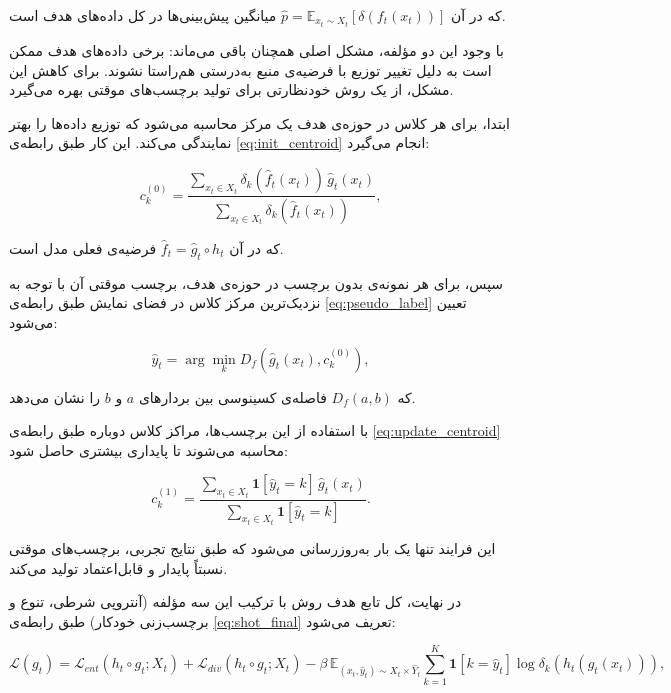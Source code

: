 که در آن $\hat{p} = \mathbb{E}_{x_t \sim X_t}[\delta(f_t(x_t))]$ میانگین پیش‌بینی‌ها در کل داده‌های هدف است.  

با وجود این دو مؤلفه، مشکل اصلی همچنان باقی می‌ماند: برخی داده‌های هدف ممکن است به دلیل تغییر توزیع با فرضیه‌ی منبع به‌درستی هم‌راستا نشوند.  
برای کاهش این مشکل،  از یک روش {خودنظارتی} برای تولید برچسب‌های موقتی بهره می‌گیرد.  

ابتدا، برای هر کلاس در حوزه‌ی هدف یک {مرکز} محاسبه می‌شود که توزیع داده‌ها را بهتر نمایندگی می‌کند. این کار طبق رابطه‌ی \ref{eq:init_centroid} انجام می‌گیرد\cite{shot}:  

\begin{equation}
	\label{eq:init_centroid}
	c^{(0)}_k = \frac{\sum_{x_t \in X_t} \delta_k(\hat{f}_t(x_t)) \, \hat{g}_t(x_t)}{\sum_{x_t \in X_t} \delta_k(\hat{f}_t(x_t))},
\end{equation}

که در آن $\hat{f}_t = \hat{g}_t \circ h_t$ فرضیه‌ی فعلی مدل است.  

سپس، برای هر نمونه‌ی بدون برچسب در حوزه‌ی هدف، برچسب موقتی آن با توجه به نزدیک‌ترین مرکز کلاس در فضای نمایش طبق رابطه‌ی \ref{eq:pseudo_label} تعیین می‌شود\cite{shot}:

\begin{equation}
	\label{eq:pseudo_label}
	\hat{y}_t = \arg \min_k D_f(\hat{g}_t(x_t), c^{(0)}_k),
\end{equation}

که $D_f(a,b)$ فاصله‌ی کسینوسی بین بردارهای $a$ و $b$ را نشان می‌دهد.  

با استفاده از این برچسب‌ها، مراکز کلاس دوباره طبق رابطه‌ی \ref{eq:update_centroid} محاسبه می‌شوند تا پایداری بیشتری حاصل شود\cite{shot}:  

\begin{equation}
	\label{eq:update_centroid}
	c^{(1)}_k = \frac{\sum_{x_t \in X_t} \mathbf{1}[\hat{y}_t = k] \, \hat{g}_t(x_t)}{\sum_{x_t \in X_t} \mathbf{1}[\hat{y}_t = k]}.
\end{equation}

این فرایند تنها یک بار به‌روزرسانی می‌شود که طبق نتایج تجربی، برچسب‌های موقتی نسبتاً پایدار و قابل‌اعتماد تولید می‌کند.  

در نهایت، کل تابع هدف روش  با ترکیب این سه مؤلفه (آنتروپی شرطی، تنوع و برچسب‌زنی خودکار) طبق رابطه‌ی \ref{eq:shot_final} تعریف می‌شود\cite{shot}:  

\begin{equation}
	\label{eq:shot_final}
	\mathcal{L}(g_t) = \mathcal{L}_{ent}(h_t \circ g_t; X_t) + \mathcal{L}_{div}(h_t \circ g_t; X_t) - 
	\beta \, \mathbb{E}_{(x_t,\hat{y}_t)\sim X_t \times \hat{Y}_t} \sum_{k=1}^{K} \mathbf{1}[k=\hat{y}_t] \log \delta_k(h_t(g_t(x_t))),
\end{equation}


